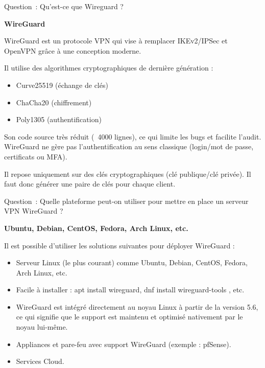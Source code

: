 \vspace{0.5cm}

Question~: Qu'est-ce que Wireguard ?

\vspace{0.5cm}

\noindent \textbf{WireGuard}

\noindent WireGuard est un protocole VPN qui vise à remplacer IKEv2/IPSec et OpenVPN grâce à une conception moderne.

\noindent Il utilise des algorithmes cryptographiques de dernière génération :

\begin{itemize}
  \item Curve25519 (échange de clés)
  \item ChaCha20 (chiffrement)
  \item Poly1305 (authentification)
\end{itemize}

\noindent Son code source très réduit (~4000 lignes), ce qui limite les bugs et facilite l’audit. WireGuard ne gère pas l'authentification au sens classique (login/mot de passe, certificats ou MFA).

\noindent Il repose uniquement sur des clés cryptographiques (clé publique/clé privée). Il faut donc générer une paire de clés pour chaque client.

\vspace{0.5cm}

\newpage

Question~: Quelle plateforme peut-on utiliser pour mettre en place un serveur VPN WireGuard ?

\noindent \textbf{Ubuntu, Debian, CentOS, Fedora, Arch Linux, etc.}

\noindent Il est possible d'utiliser les solutions suivantes pour déployer WireGuard :

\begin{itemize}
  \item Serveur Linux (le plus courant) comme Ubuntu, Debian, CentOS, Fedora, Arch Linux, etc.
  \item Facile à installer : apt install wireguard, dnf install wireguard-tools , etc.
  \item WireGuard est intégré directement au noyau Linux à partir de la version 5.6, ce qui signifie que le support est maintenu et optimisé nativement par le noyau lui-même.
  \item Appliances et pare-feu avec support WireGuard (exemple : pfSense).
  \item Services Cloud.
\end{itemize}

